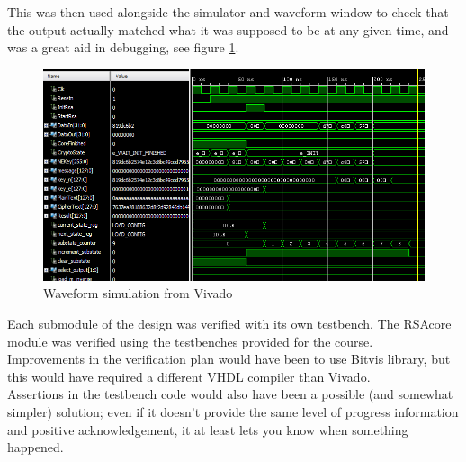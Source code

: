 \inputminted[firstline=45,lastline=56]{python}{../Project/monexp.py}

This was then used alongside the simulator and waveform window to check that the output actually matched what it was supposed to be at any given time, and was a great aid in debugging, see figure \ref{fig:waveform}.\\
\begin{figure}[H]
\centering
\includegraphics[width=\textwidth]{images/Vivado_waveform}
\caption{Waveform simulation from Vivado}
\label{fig:waveform}
\end{figure}
Each submodule of the design was verified with its own testbench. %
The RSAcore module was verified using the testbenches provided for the course.
\\
Improvements in the verification plan would have been to use Bitvis library, but this would have required a different VHDL compiler than Vivado. \\
Assertions in the testbench code would also have been a possible (and somewhat simpler) solution; even if it doesn't provide the same level of progress information and positive acknowledgement, it at least lets you know when something happened.